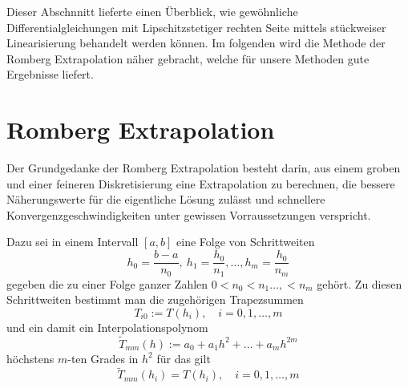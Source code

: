 Dieser Abschnnitt lieferte einen Überblick, wie gewöhnliche Differentialgleichungen mit Lipschitzstetiger rechten Seite mittels stückweiser Linearisierung behandelt werden können. Im folgenden wird die Methode der Romberg Extrapolation näher gebracht, welche für unsere Methoden gute Ergebnisse liefert.
\section{Romberg Extrapolation}
Der Grundgedanke der Romberg Extrapolation besteht darin, aus einem groben und einer feineren Diskretisierung eine Extrapolation zu berechnen, die bessere Näherungswerte für die eigentliche Lösung zulässt und schnellere Konvergenzgeschwindigkeiten unter gewissen Vorraussetzungen verspricht.

Dazu sei in einem Intervall $[a,b]$ eine Folge von Schrittweiten 
\[
 h_0 = \frac{b-a}{n_0},~ h_1 = \frac{h_0}{n_1},\ldots, h_m = \frac{h_0}{n_m}
\]
gegeben die zu einer Folge ganzer Zahlen $0<n_0<n_1\ldots,<n_m$ gehört. Zu diesen Schrittweiten bestimmt man die zugehörigen Trapezsummen
\[
 T_{i0} := T(h_i), \quad i=0,1,\ldots,m
\]
und ein damit ein Interpolationspolynom 
\[
 \tilde T_{mm}(h):= a_0 + a_1h^2 +\ldots + a_m h^{2m}
\]
höchstens $m$-ten Grades in $h^2$ für das gilt
\[
 \tilde T_{mm}(h_i) = T(h_i), \quad i=0,1,\ldots,m
\]




\cite{stoer1989numerische}